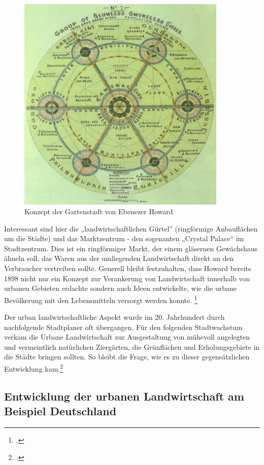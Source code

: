 \documentclass{scrartcl}
\begin{document}
\begin{figure}[htbp]
\centering
\includegraphics[width=10cm]{image_folder/GardenCityConcept_EbenezerHoward.jpg}
\caption{Konzept der Gartenstadt von Ebenezer Howard}
\label{fig:GardenCityConcept_EbenezerHoward}
\end{figure}

Interessant sind hier die „landwirtschaftlichen Gürtel” (ringförmige Anbauflächen um die Städte) und das Marktzentrum - den sogenanten „Crystal Palace“ im Stadtzentrum. Dies ist ein ringförmiger Markt, der einem gläsernen Gewächshaus ähneln soll, das Waren aus der umliegenden Landwirtschaft direkt an den Verbraucher vertreiben sollte. Generell bleibt festzuhalten, dass Howard bereits 1898 nicht nur ein Konzept zur Verankerung von Landwirtschaft innerhalb von urbanen Gebieten erdachte sondern auch Ideen entwickelte, wie die urbane Bevölkerung mit den Lebensmitteln versorgt werden konnte. \footcite[Vgl.][S. 19ff]{Lohrberg2001StadtnaheFreiraumplanung}

Der urban landwirtschaftliche Aspekt wurde im 20. Jahrhundert durch nachfolgende Stadtplaner oft übergangen. Für den folgenden Stadtwachstum verkam die Urbane Landwirtschaft zur Ausgestaltung von mühevoll angelegten und vermeintlich natürlichen Ziergärten, die Grünflächen und Erholungsgebiete in die Städte bringen sollten. So bleibt die Frage, wie es zu dieser gegensätzlichen Entwicklung kam.\footcite[Vgl.][S. 144f]{MullerUrbanStadt}

\subsection{Entwicklung der urbanen Landwirtschaft am Beispiel Deutschland}
\end{document}
